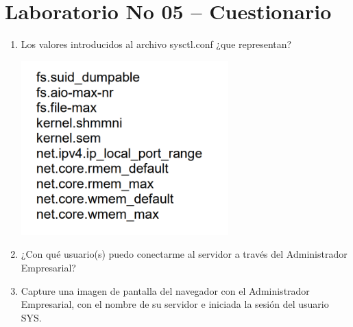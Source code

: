 \section{Laboratorio No 05 – Cuestionario} 

\begin{enumerate}[1.]
	\item Los valores introducidos al archivo sysctl.conf ¿que representan?
	\begin{center}
	\includegraphics[width=8cm]{./Imagenes/actividad_5_1_lab_05}
	\end{center}
	\item ¿Con qué usuario(s) puedo conectarme al servidor a través del Administrador Empresarial?
	
	\item Capture una imagen de pantalla del navegador con el Administrador Empresarial, con el nombre de su servidor e iniciada la sesión del usuario SYS.
	
	

\end{enumerate} 
